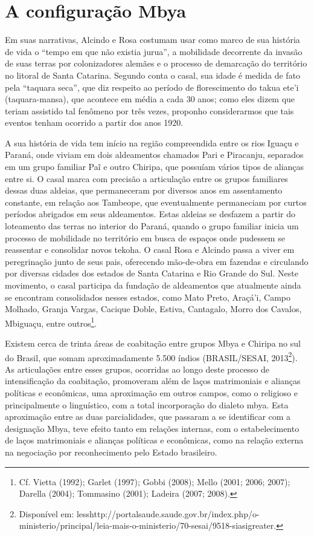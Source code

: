 \section{A configuração Mbya}

Em suas narrativas, Alcindo e Rosa costumam usar como marco de sua
história de vida o ``tempo em que não existia jurua'', a mobilidade
decorrente da invasão de suas terras por colonizadores alemães e o
processo de demarcação do território no litoral de Santa Catarina.
Segundo conta o casal, sua idade é medida de fato pela ``taquara seca'',
que diz respeito ao período de florescimento do takua ete’i
(taquara-mansa), que acontece em média a cada 30 anos; como eles dizem
que teriam assistido tal fenômeno por três vezes, proponho
considerarmos que tais eventos tenham ocorrido a partir dos anos 1920.

A sua história de vida tem início na região compreendida entre os rios
Iguaçu e Paraná, onde viviam em dois aldeamentos chamados Pari e
Piracanju, separados em um grupo familiar Paĩ e
outro Chiripa, que possuíam vários tipos de alianças entre si. O casal
marca com precisão a articulação entre os grupos familiares dessas duas
aldeias, que permaneceram por diversos anos em assentamento constante,
em relação aos Tambeope, que eventualmente permaneciam por curtos
períodos abrigados em seus aldeamentos. Estas aldeias se desfazem a
partir do loteamento das terras no interior do Paraná, quando o grupo
familiar inicia um processo de mobilidade no território em busca de
espaços onde pudessem se reassentar e consolidar novos tekoha. O casal
Rosa e Alcindo passa a viver em peregrinação junto de seus pais,
oferecendo mão-de-obra em fazendas e circulando por diversas cidades
dos estados de Santa Catarina e Rio Grande do Sul. Neste movimento, o
casal participa da fundação de aldeamentos que atualmente ainda se
encontram consolidados nesses estados, como Mato Preto, Araçá’i, Campo
Molhado, Granja Vargas, Cacique Doble, Estiva, Cantagalo, Morro dos
Cavalos, Mbiguaçu, entre outros\footnote{Cf. Vietta (1992); Garlet
(1997); Gobbi (2008); Mello (2001; 2006; 2007); Darella (2004);
Tommasino (2001); Ladeira (2007; 2008).}.

Existem cerca de trinta áreas de coabitação entre grupos Mbya e Chiripa
no sul do Brasil, que somam aproximadamente 5.500 índios (BRASIL/SESAI,
2013\footnote{Disponível em:
{less}http://portalsaude.saude.gov.br/index.php/o-ministerio/principal/leia-mais-o-ministerio/70-sesai/9518-siasi{greater}.}).
As articulações entre esses grupos, ocorridas ao longo deste processo
de intensificação da coabitação, promoveram além de laços matrimoniais
e alianças políticas e econômicas, uma aproximação em outros campos,
como o religioso e principalmente o linguístico, com a total
incorporação do dialeto mbya. Esta aproximação entre as duas
parcialidades, que passaram a se identificar com a designação Mbya,
teve efeito tanto em relações internas, com o estabelecimento de laços
matrimoniais e alianças políticas e econômicas, como na relação externa
na negociação por reconhecimento pelo Estado brasileiro.

